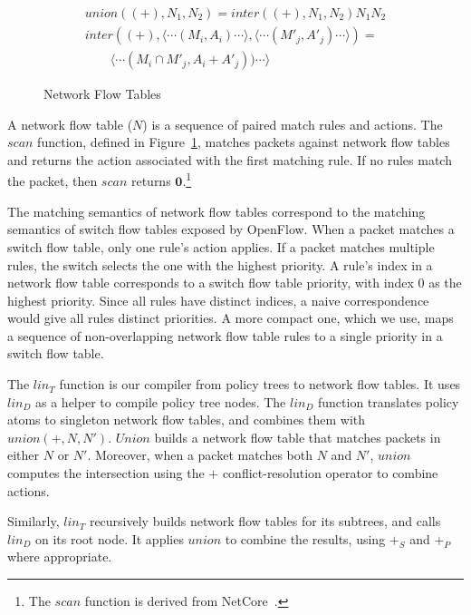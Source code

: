 \begin{figure}[t]
\begin{displaymath}
\begin{array}{l}
\mathit{union}((+),N_1,N_2) = \mathit{inter}((+),N_1,N_2) N_1 N_2 \\
\mathit{inter}((+),\langle\cdots(M_i,A_i)\cdots\rangle, \langle\cdots(M'_j,A'_j)\cdots\rangle) = \\
\qquad \langle\cdots(M_i \cap M'_j,A_i+A'_j))\cdots\rangle
\end{array}
\end{displaymath}

\caption{Network Flow Tables}
\label{f:intermediate}

\end{figure}

A network flow table ($N$) is a sequence of paired match rules
and actions. The $\mathit{scan}$ function, defined in
Figure~\ref{f:intermediate}, matches packets against network flow
tables and returns the action associated with the first matching rule. If
no rules match the packet, then $\mathit{scan}$ returns $\textbf{0}$.\footnote{The
  $\mathit{scan}$ function is derived from 
  NetCore~\cite{monsanto:popl12-netcore}.}

The matching semantics of network flow tables correspond to the
matching semantics of switch flow tables exposed by OpenFlow.  When a
packet matches a switch flow table, only one rule's action applies. If a
packet matches multiple rules, the switch selects the one with the
highest priority.  A rule's index in a network flow table corresponds
to a switch flow table priority, with index $0$ as the highest
priority. Since all rules have distinct indices, a naive
correspondence would give all rules distinct priorities. A more
compact one, which we use, maps a sequence of
non-overlapping network flow table rules to a single priority in a
switch flow table.

The $\mathit{lin}_T$ function is our compiler from policy trees to
network flow tables. It uses $\mathit{lin}_D$ as a helper to compile
policy tree nodes.  The $\mathit{lin}_D$ function translates policy
atoms to singleton network flow tables, and combines them with
$\mathit{union(+,N,N')}$.  $\mathit{Union}$ builds a network flow table that
matches packets in either $N$ or $N'$. Moreover, when a packet
matches both $N$ and $N'$, $\mathit{union}$ computes the intersection
using the $+$ conflict-resolution operator to combine
actions.

Similarly, $\mathit{lin}_T$ recursively builds network flow tables for
its subtrees, and calls $\mathit{lin}_D$ on its root node.  It applies
$\mathit{union}$ to combine the results, using $+_S$ and $+_P$ where
appropriate.


